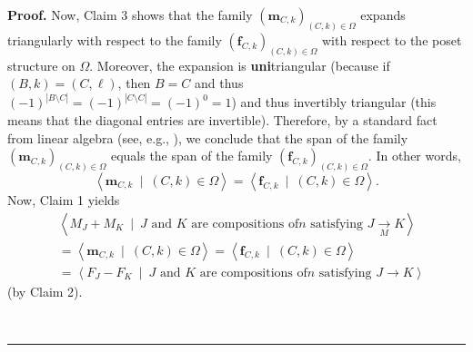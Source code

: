 \documentclass[numbers=enddot,12pt,final,onecolumn,notitlepage]{scrartcl}%
\theoremstyle{definition}
\newenvironment{proof}[1][Proof]{\noindent\textbf{#1.} }{\ \rule{0.5em}{0.5em}}
\newenvironment{verlong}{}{}
\begin{document}
\begin{verlong}
\begin{proof}
Now, Claim 3 shows that the family $\left(  \mathbf{m}_{C,k}\right)  _{\left(
C,k\right)  \in\Omega}$ expands triangularly with respect to the family
$\left(  \mathbf{f}_{C,k}\right)  _{\left(  C,k\right)  \in\Omega}$ with
respect to the poset structure on $\Omega$. Moreover, the expansion is
\textbf{uni}triangular (because if $\left(  B,k\right)  =\left(
C,\ell\right)  $, then $B=C$ and thus $\left(  -1\right)  ^{\left\vert
B\setminus C\right\vert }=\left(  -1\right)  ^{\left\vert C\setminus
C\right\vert }=\left(  -1\right)  ^{0}=1$) and thus invertibly triangular
(this means that the diagonal entries are invertible). Therefore, by a
standard fact from linear algebra (see, e.g., \cite[Corollary 11.1.19
\textbf{(b)}]{HopfComb}), we conclude that the span of the family $\left(
\mathbf{m}_{C,k}\right)  _{\left(  C,k\right)  \in\Omega}$ equals the span of
the family $\left(  \mathbf{f}_{C,k}\right)  _{\left(  C,k\right)  \in\Omega}%
$. In other words,%
\[
\left\langle \mathbf{m}_{C,k}\ \mid\ \left(  C,k\right)  \in\Omega
\right\rangle =\left\langle \mathbf{f}_{C,k}\ \mid\ \left(  C,k\right)
\in\Omega\right\rangle .
\]
Now, Claim 1 yields%
\begin{align*}
&  \left\langle M_{J}+M_{K}\ \mid\ J\text{ and }K\text{ are compositions of
}n\text{ satisfying }J\underset{M}{\rightarrow}K\right\rangle \\
&  =\left\langle \mathbf{m}_{C,k}\ \mid\ \left(  C,k\right)  \in
\Omega\right\rangle =\left\langle \mathbf{f}_{C,k}\ \mid\ \left(  C,k\right)
\in\Omega\right\rangle \\
&  =\left\langle F_{J}-F_{K}\ \mid\ J\text{ and }K\text{ are compositions of
}n\text{ satisfying }J\rightarrow K\right\rangle
\end{align*}
(by Claim 2).


\end{proof}
\end{verlong}
\end{document}
